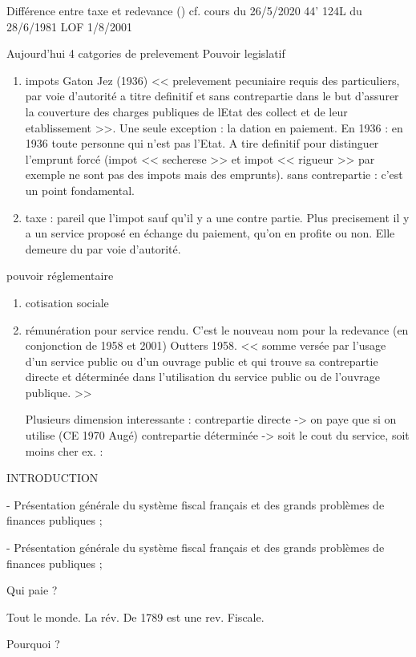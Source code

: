 

Différence entre taxe et redevance ()
cf. cours du 26/5/2020 44'
124L du 28/6/1981
LOF 1/8/2001

Aujourd'hui 4 catgories de prelevement
Pouvoir legislatif
\begin{enumerate}
  \item impots Gaton Jez (1936) << prelevement pecuniaire requis des particuliers, par voie d'autorité a titre definitif et sans contrepartie dans le but d'assurer la couverture des charges publiques de lEtat des collect et de leur etablissement >>. Une seule exception : la dation en paiement. En 1936 : en 1936 toute personne qui n'est pas l'Etat. A tire definitif pour distinguer l'emprunt forcé (impot << secherese >> et impot << rigueur >> par exemple ne sont pas des impots mais des emprunts). sans contrepartie : c'est un point fondamental.
  \item taxe : pareil que l'impot sauf qu'il y a une contre partie. Plus precisement il y a un service proposé en échange du paiement, qu'on en profite ou non. Elle demeure du par voie d'autorité.
\end{enumerate}

pouvoir réglementaire
\begin{enumerate}
  \item cotisation sociale
  \item rémunération pour service rendu. C'est le nouveau nom pour la redevance (en conjonction de 1958 et 2001)
  Outters 1958. << somme versée par l'usage d'un service public ou d'un ouvrage public et qui trouve sa contrepartie directe et déterminée dans l'utilisation du service public ou de l'ouvrage publique. >>

  Plusieurs dimension interessante : contrepartie directe -> on paye que si on utilise (CE 1970 Augé)
  contrepartie déterminée -> soit le cout du service, soit moins cher ex. : 
\end{enumerate}

INTRODUCTION

-	Présentation générale du système fiscal français et des grands problèmes de finances publiques ;

-	Présentation générale du système fiscal français et des grands problèmes de finances publiques ;


Qui paie ?


Tout le monde. La rév. De 1789 est une rev. Fiscale.


Pourquoi ?


